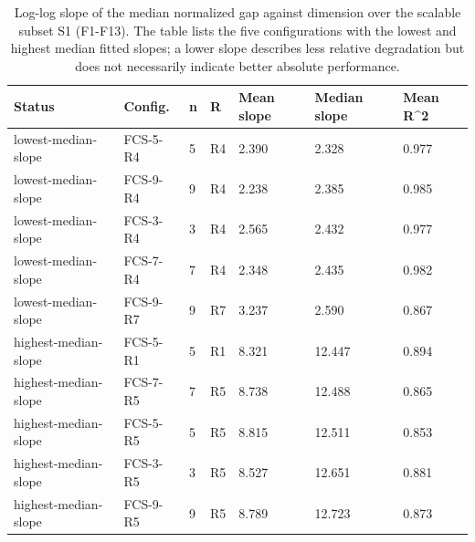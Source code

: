 \begin{table}[h]
\centering
\caption{Log-log slope of the median normalized gap against dimension over the scalable subset S1 (F1-F13). The table lists the five configurations with the lowest and highest median fitted slopes; a lower slope describes less relative degradation but does not necessarily indicate better absolute performance.}
\label{tab:scaling_slopes}
\setlength{\tabcolsep}{3pt}
\begin{tabular}{lllllll}
\toprule
Status & Config. & n & R & Mean slope & Median slope & Mean R\textasciicircum{}2 \\
\midrule
lowest-median-slope & FCS-5-R4 & 5 & R4 & 2.390 & 2.328 & 0.977 \\
lowest-median-slope & FCS-9-R4 & 9 & R4 & 2.238 & 2.385 & 0.985 \\
lowest-median-slope & FCS-3-R4 & 3 & R4 & 2.565 & 2.432 & 0.977 \\
lowest-median-slope & FCS-7-R4 & 7 & R4 & 2.348 & 2.435 & 0.982 \\
lowest-median-slope & FCS-9-R7 & 9 & R7 & 3.237 & 2.590 & 0.867 \\
highest-median-slope & FCS-5-R1 & 5 & R1 & 8.321 & 12.447 & 0.894 \\
highest-median-slope & FCS-7-R5 & 7 & R5 & 8.738 & 12.488 & 0.865 \\
highest-median-slope & FCS-5-R5 & 5 & R5 & 8.815 & 12.511 & 0.853 \\
highest-median-slope & FCS-3-R5 & 3 & R5 & 8.527 & 12.651 & 0.881 \\
highest-median-slope & FCS-9-R5 & 9 & R5 & 8.789 & 12.723 & 0.873 \\
\bottomrule
\end{tabular}
\end{table}
